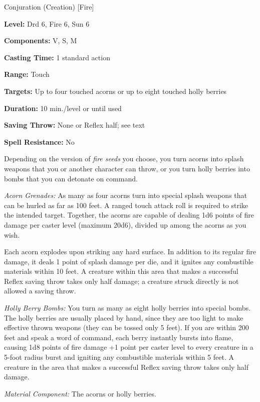 
Conjuration (Creation) [Fire]

\textbf{Level:} Drd 6, Fire 6, Sun 6

\textbf{Components:} V, S, M

\textbf{Casting Time:} 1 standard action

\textbf{Range:} Touch

\textbf{Targets:} Up to four touched acorns or up to eight touched holly berries

\textbf{Duration:} 10 min./level or until used

\textbf{Saving Throw:} None or Reflex half; see text

\textbf{Spell Resistance:} No

Depending on the version of \textit{fire seeds} you choose, you turn acorns into 
splash weapons that you or another character can throw, or you turn holly berries 
into bombs that you can detonate on command.

\textit{Acorn Grenades:} As many as four acorns turn into special splash weapons 
that can be hurled as far as 100 feet. A ranged touch attack roll is required to 
strike the intended target. Together, the acorns are capable of dealing 1d6 points 
of fire damage per caster level (maximum 20d6), divided up among the acorns as 
you wish.

Each acorn explodes upon striking any hard surface. In addition to its regular 
fire damage, it deals 1 point of splash damage per die, and it ignites any combustible 
materials within 10 feet. A creature within this area that makes a successful Reflex 
saving throw takes only half damage; a creature struck directly is not allowed 
a saving throw.

\textit{Holly Berry Bombs:} You turn as many as eight holly berries into special 
bombs. The holly berries are usually placed by hand, since they are too light to 
make effective thrown weapons (they can be tossed only 5 feet). If you are within 
200 feet and speak a word of command, each berry instantly bursts into flame, causing 
1d8 points of fire damage +1 point per caster level to every creature in a 5-foot 
radius burst and igniting any combustible materials within 5 feet. A creature in 
the area that makes a successful Reflex saving throw takes only half damage.

\textit{Material Component:} The acorns or holly berries.


